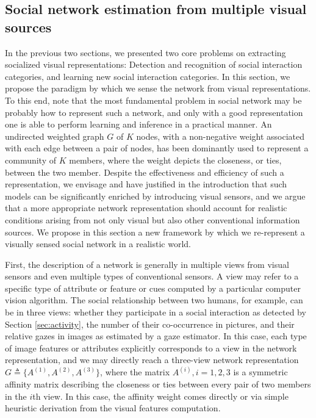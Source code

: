 \subsection{Social network estimation from multiple visual sources}
\label{sec:vis2net}

In the previous two sections, we presented two core problems on extracting socialized visual representations: Detection and recognition of social interaction categories, and learning new social interaction categories. In this section, we propose the paradigm by which we sense the network from visual representations. To this end, note that the most fundamental problem in social network may be probably how to represent such a network, and only with a good representation one is able to perform learning and inference in a practical manner. An undirected weighted graph $G$ of $K$ nodes, with a non-negative weight associated with each edge between a pair of nodes, has been dominantly used to represent a community of $K$ members, where the weight depicts the closeness, or ties, between the two member. Despite the effectiveness and efficiency of such a representation, we envisage and have justified in the introduction that such models can be significantly enriched by introducing visual sensors, and we argue that a more appropriate network representation should account for realistic conditions arising from not only visual but also other conventional information sources. We propose in this section a new framework by which we re-represent a visually sensed social network in a realistic world.

First, the description of a network is generally in multiple views from visual sensors and even multiple types of conventional sensors.  A view may refer to a specific type of attribute or feature or cues computed by a particular computer vision algorithm. The social relationship between two humans, for example, can be in three views: whether they participate in a social interaction as detected by Section \ref{sec:activity}, the number of their co-occurrence in pictures, and their relative gazes in images as estimated by a gaze estimator. In this case, each type of image features or attributes explicitly corresponds to a view in the network representation, and we may directly reach a three-view network representation $G\triangleq\{A^{(1)}, A^{(2)}, A^{(3)}\}$, where the matrix $A^{(i)}, i=1,2,3$ is a symmetric affinity matrix describing the closeness or ties between every pair of two members in the $i$th view. In this case, the affinity weight comes directly or via simple heuristic derivation from the visual features computation. 

